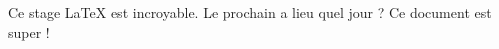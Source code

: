 \setlength{\columnseprule}{0mm}
\begin{multicols}{3}\raggedcolumns
Ce stage \LaTeX{} est incroyable.
\columnbreak
Le prochain a lieu quel jour ?
\columnbreak
Ce document est super !
\end{multicols}